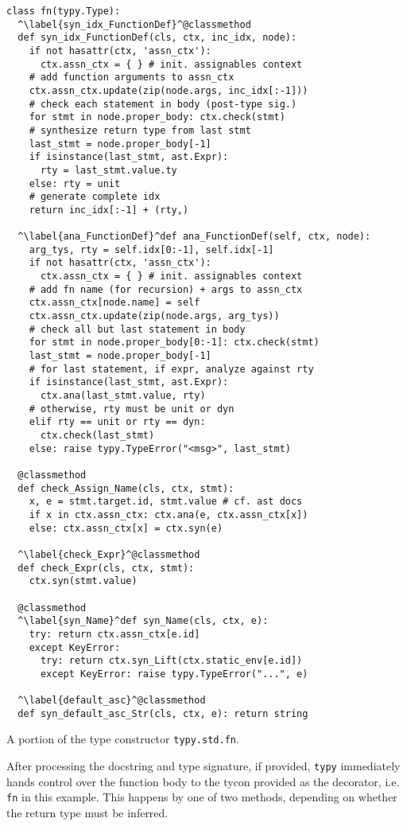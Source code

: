 \documentclass{sigplanconf}
\newcommand{\lip}[1]{\lstinline[language=Python,basicstyle=\ttfamily\small,deletendkeywords={tuple,buffer,map}]{#1}}
\begin{document}
\begin{codelisting}[t]
\begin{lstlisting}
class fn(typy.Type):
  ^\label{syn_idx_FunctionDef}^@classmethod
  def syn_idx_FunctionDef(cls, ctx, inc_idx, node):
    if not hasattr(ctx, 'assn_ctx'): 
      ctx.assn_ctx = { } # init. assignables context
    # add function arguments to assn_ctx
    ctx.assn_ctx.update(zip(node.args, inc_idx[:-1]))
    # check each statement in body (post-type sig.)
    for stmt in node.proper_body: ctx.check(stmt)
    # synthesize return type from last stmt
    last_stmt = node.proper_body[-1]
    if isinstance(last_stmt, ast.Expr): 
      rty = last_stmt.value.ty
    else: rty = unit
    # generate complete idx
    return inc_idx[:-1] + (rty,)

  ^\label{ana_FunctionDef}^def ana_FunctionDef(self, ctx, node):
    arg_tys, rty = self.idx[0:-1], self.idx[-1]
    if not hasattr(ctx, 'assn_ctx'): 
      ctx.assn_ctx = { } # init. assignables context
    # add fn name (for recursion) + args to assn_ctx
    ctx.assn_ctx[node.name] = self
    ctx.assn_ctx.update(zip(node.args, arg_tys))
    # check all but last statement in body
    for stmt in node.proper_body[0:-1]: ctx.check(stmt)
    last_stmt = node.proper_body[-1]
    # for last statement, if expr, analyze against rty
    if isinstance(last_stmt, ast.Expr): 
      ctx.ana(last_stmt.value, rty)
    # otherwise, rty must be unit or dyn
    elif rty == unit or rty == dyn: 
      ctx.check(last_stmt)
    else: raise typy.TypeError("<msg>", last_stmt)

  @classmethod
  def check_Assign_Name(cls, ctx, stmt):
    x, e = stmt.target.id, stmt.value # cf. ast docs
    if x in ctx.assn_ctx: ctx.ana(e, ctx.assn_ctx[x])
    else: ctx.assn_ctx[x] = ctx.syn(e)

  ^\label{check_Expr}^@classmethod
  def check_Expr(cls, ctx, stmt):
    ctx.syn(stmt.value)
    
  @classmethod
  ^\label{syn_Name}^def syn_Name(cls, ctx, e):
    try: return ctx.assn_ctx[e.id]
    except KeyError:
      try: return ctx.syn_Lift(ctx.static_env[e.id])
      except KeyError: raise typy.TypeError("...", e)
  
  ^\label{default_asc}^@classmethod
  def syn_default_asc_Str(cls, ctx, e): return string
\end{lstlisting}
\caption{A portion of the type constructor \texttt{typy.std.fn}.}
\label{fn-top}
\end{codelisting}
After processing the docstring and type signature, if provided, \verb|typy| immediately hands control over the function body to the tycon provided as the decorator, i.e. \lip{fn} in this example. This happens by one of two methods, depending on whether the return type must be inferred.
\end{document}
